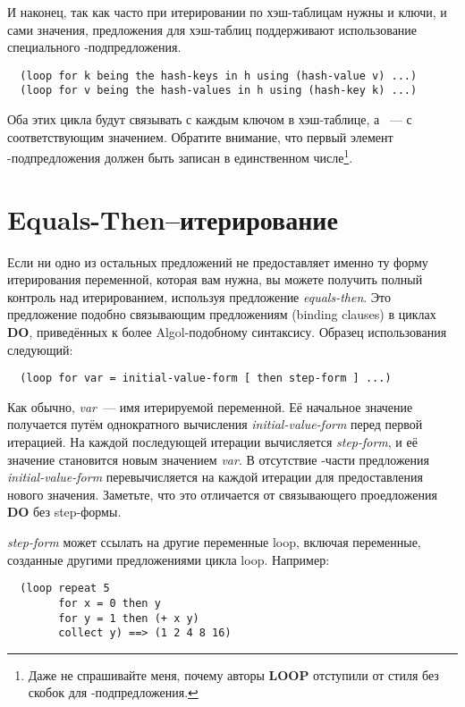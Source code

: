 И наконец, так как часто при итерировании по хэш-таблицам нужны и ключи, и сами значения,
предложения для хэш-таблиц поддерживают использование специального
-подпредложения.

\begin{lstlisting}
  (loop for k being the hash-keys in h using (hash-value v) ...)
  (loop for v being the hash-values in h using (hash-key k) ...)
\end{lstlisting}

Оба этих цикла будут связывать  с каждым ключом в хэш-таблице, а ~--- с
соответствующим значением. Обратите внимание, что первый элемент
-подпредложения должен быть записан в единственном числе\footnote{Даже не
    спрашивайте меня, почему авторы \textbf{LOOP} отступили от стиля без скобок для
    -подпредложения.}.

\section{Equals-Then--итерирование}

Если ни одно из остальных предложений  не предоставляет именно ту форму
итерирования переменной, которая вам нужна, вы можете получить полный контроль над
итерированием, используя предложение \textit{equals-then}. Это предложение подобно
связывающим предложениям (binding clauses) в циклах \textbf{DO}, приведённых к более
Algol-подобному синтаксису. Образец использования следующий:

\begin{lstlisting}
  (loop for var = initial-value-form [ then step-form ] ...)
\end{lstlisting}

Как обычно, \textit{var}~--- имя итерируемой переменной. Её начальное значение получается
путём однократного вычисления \textit{initial-value-form} перед первой итерацией. На
каждой последующей итерации вычисляется \textit{step-form}, и её значение становится новым
значением \textit{var}. В отсутствие -части предложения
\textit{initial-value-form} перевычисляется на каждой итерации для предоставления нового
значения. Заметьте, что это отличается от связывающего проедложения \textbf{DO} без
step-формы.

\textit{step-form} может ссылать на другие переменные loop, включая переменные, созданные
другими предложениями  цикла loop. Например:

\begin{lstlisting}
  (loop repeat 5 
        for x = 0 then y
        for y = 1 then (+ x y)
        collect y) ==> (1 2 4 8 16)
\end{lstlisting}

